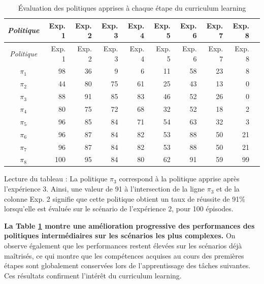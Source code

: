 \begin{longtable}{crrrrrrrrr}

\caption{Évaluation des politiques apprises à chaque étape du curriculum learning} \label{tab:curriculum_perf} \\
\toprule
\textit{Politique} & Exp. 1 & Exp. 2 & Exp. 3 & Exp. 4 & Exp. 5 & Exp. 6 & Exp. 7 & Exp. 8 \\
\midrule
\endfirsthead
\toprule
\textit{Politique} & Exp. 1 & Exp. 2 & Exp. 3 & Exp. 4 & Exp. 5 & Exp. 6 & Exp. 7 & Exp. 8 \\
\midrule
\endhead
\midrule
\endfoot
\bottomrule
\endlastfoot

$\pi_1$ & 98 & 36 & 9 & 6 & 11 & 58 & 23 & 8 \\
\midrule
$\pi_2$ & 44 & 80 & 75 & 61 & 25 & 43 & 13 & 0 \\
\midrule
$\pi_3$ & 88 & 91 & 85 & 83 & 46 & 52 & 26 & 0 \\
\midrule
$\pi_4$ & 80 & 75 & 72 & 68 & 32 & 52 & 18 & 2 \\
\midrule
$\pi_5$ & 96 & 85 & 84 & 71 & 54 & 63 & 32 & 3 \\
\midrule
$\pi_6$ & 96 & 87 & 84 & 82 & 53 & 88 & 50 & 21 \\
\midrule
$\pi_7$ & 96 & 87 & 84 & 82 & 53 & 88 & 50 & 21 \\
\midrule
$\pi_8$ & 100 & 95 & 84 & 80 & 62 & 91 & 59 & 99 \\

\end{longtable}
\vspace{-10pt}
{
\footnotesize
\color{darkgray}
\noindent Lecture du tableau : La politique $\pi_3$ correspond à la politique apprise après l'expérience 3. Ainsi, une valeur de 91 à l'intersection de la ligne $\pi_3$ et de la colonne Exp. 2 signifie que cette politique obtient un taux de réussite de 91\% lorsqu'elle est évaluée sur le scénario de l'expérience 2, pour 100 épisodes.
}

\vspace{10pt}

\noindent \textbf{La Table \ref{tab:curriculum_perf} montre une amélioration progressive des performances des politiques intermédiaires sur les scénarios les plus complexes.} On observe également que les performances restent élevées sur les scénarios déjà maîtrisés, ce qui montre que les compétences acquises au cours des premières étapes sont globalement conservées lors de l'apprentissage des tâches suivantes. Ces résultats confirment l'intérêt du curriculum learning.


